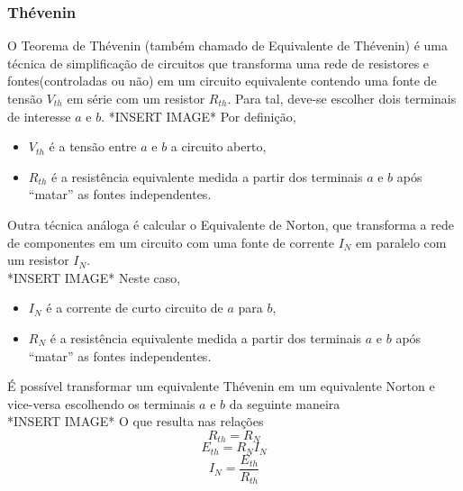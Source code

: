 \documentclass{article}
\numberwithin{equation}{section}
\begin{document}
    \subsubsection{Thévenin}
    \label{subsubsec:thevenin}
    O Teorema de Thévenin (também chamado de Equivalente de Thévenin) é uma técnica de simplificação de circuitos que transforma uma rede de resistores e fontes(controladas ou não) em um circuito equivalente contendo uma fonte de tensão $V_{th}$ em série com um resistor $R_{th}$. Para tal, deve-se escolher dois terminais de interesse $a$ e $b$.
    *INSERT IMAGE*
    Por definição,
    \begin{itemize}
        \item $V_{th}$ é a tensão entre $a$ e $b$ a circuito aberto,
        \item $R_{th}$ é a resistência equivalente medida a partir dos terminais $a$ e $b$ após ``matar'' as fontes independentes.
    \end{itemize}
    Outra técnica análoga é calcular o Equivalente de Norton, que transforma a rede de componentes em um circuito com uma fonte de corrente $I_{N}$ em paralelo com um resistor $I_{N}$. \\
    *INSERT IMAGE*
    Neste caso,
    \begin{itemize}
        \item $I_{N}$ é a corrente de curto circuito de $a$ para $b$,
        \item $R_{N}$ é a resistência equivalente medida a partir dos terminais $a$ e $b$ após ``matar'' as fontes independentes.
    \end{itemize}
    É possível transformar um equivalente Thévenin em um equivalente Norton e vice-versa escolhendo os terminais $a$ e $b$ da seguinte maneira \\
    *INSERT IMAGE*
    O que resulta nas relações
    $$    R_{th}=R_{N} $$
    \begin{equation}
        E_{th}=R_{N}I_{N}
    \end{equation}
    \begin{equation}
        I_{N}=\frac{E_{th}}{R_{th}}
    \end{equation}
\end{document}
